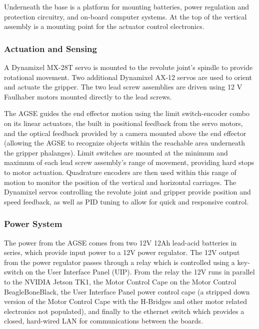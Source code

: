 Underneath the base is a platform for mounting batteries, power
regulation and protection circuitry, and on-board computer systems.  At
the top of the vertical assembly is a mounting point for the actuator
control electronics.


\subsubsection{Actuation and Sensing}

A Dynamixel MX-28T servo is mounted to the revolute joint's spindle to
provide rotational movement. Two additional Dynamixel AX-12 servos are used
to orient and actuate the gripper. The two lead screw assemblies are
driven using 12 V Faulhaber motors mounted directly to the lead
screws.

The AGSE guides the end effector motion using the limit switch-encoder
combo on its linear actuators, the built in positional feedback from
the servo motors, and the optical feedback provided by a camera
mounted above the end effector (allowing the AGSE to recognize objects
within the reachable area underneath the gripper phalanges).  Limit
switches are mounted at the minimum and maximum of each lead screw
assembly's range of movement, providing hard stops to motor actuation.
Quadrature encoders are then used within this range of motion to
monitor the position of the vertical and horizontal carriages. The
Dynamixel servos controlling the revolute joint and gripper provide
position and speed feedback, as well as PID tuning to allow for quick
and responsive control.

\subsubsection{Power System}
%

The power from the AGSE comes from two 12V 12Ah lead-acid batteries in
series, which provide input power to a 12V power regulator.  The 12V
output from the power regulator passes through a relay which is
controlled using a key-switch on the User Interface Panel (UIP).  From
the relay the 12V runs in parallel to the NVIDIA Jetson TK1, the Motor
Control Cape on the Motor Control BeagleBoneBlack, the User Interface
Panel power control cape (a stripped down version of the Motor Control
Cape with the H-Bridges and other motor related electronics not
populated), and finally to the ethernet switch which provides a
closed, hard-wired LAN for communications between the boards.

